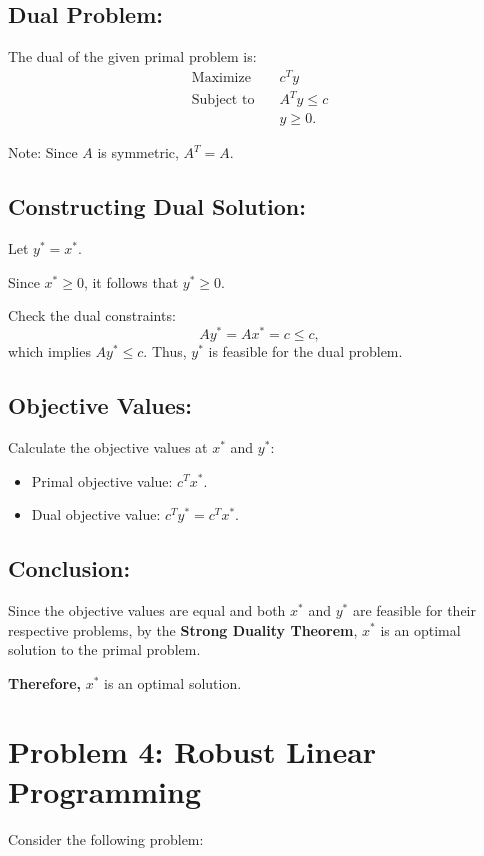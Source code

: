 \documentclass{article}
\begin{document}
\subsection{Dual Problem:}
The dual of the given primal problem is:
\begin{align*}
\text{Maximize} \quad & c^T y \\
\text{Subject to} \quad & A^T y \leq c \\
& y \geq 0.
\end{align*}

Note: Since $A$ is symmetric, $A^T = A$.

\subsection{Constructing Dual Solution:}
Let $y^* = x^*$.

Since $x^* \geq 0$, it follows that $y^* \geq 0$.

Check the dual constraints:
\[
A y^* = A x^* = c \leq c,
\]
which implies $A y^* \leq c$. Thus, $y^*$ is feasible for the dual problem.

\subsection{Objective Values:}
Calculate the objective values at $x^*$ and $y^*$:

\begin{itemize}
    \item Primal objective value: $c^T x^*$.
    \item Dual objective value: $c^T y^* = c^T x^*$.
\end{itemize}

\subsection{Conclusion:}
Since the objective values are equal and both $x^*$ and $y^*$ are feasible for their respective problems, by the \textbf{Strong Duality Theorem}, $x^*$ is an optimal solution to the primal problem.

\textbf{Therefore,} $x^*$ is an optimal solution.


\section*{Problem 4: Robust Linear Programming}

Consider the following problem:
\end{document}
